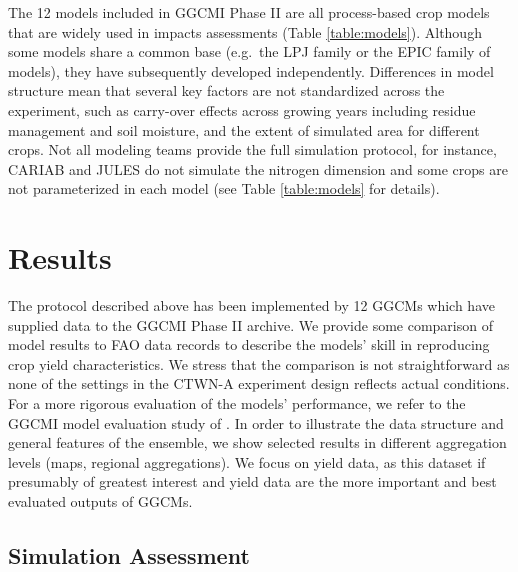 \documentclass[gmd, manuscript]{copernicus} %
\begin{document}
The 12 models included in GGCMI Phase II are all process-based crop models that are widely used in impacts assessments (Table \ref{table:models}). 
Although some models share a common base (e.g.\ the LPJ family or the EPIC family of models), they have subsequently developed independently. 
Differences in model structure mean that several key factors are not standardized across the experiment, such as carry-over effects across growing years including residue management and soil moisture, and the extent of simulated area for different crops. 
Not all modeling teams provide the full simulation protocol, for instance, CARIAB and JULES do not simulate the nitrogen dimension and some crops are not parameterized in each model (see Table \ref{table:models} for details). 

\section{Results}

The protocol described above has been implemented by 12 GGCMs which have supplied data to the GGCMI Phase II archive. 
We provide some comparison of model results to FAO data records to describe the models' skill in reproducing crop yield characteristics. 
We stress that the comparison is not straightforward as none of the settings in the CTWN-A experiment design reflects actual conditions. 
For a more rigorous evaluation of the models' performance, we refer to the GGCMI model evaluation study of \citet{muller_global_2017}. In order to illustrate the data structure and general features of the ensemble, we show selected results in different aggregation levels (maps, regional aggregations). 
We focus on yield data, as this dataset if presumably of greatest interest and yield data are the more important and best evaluated outputs of GGCMs.

\subsection{Simulation Assessment}
\label{S:3}
\end{document}
